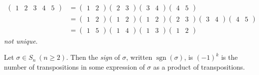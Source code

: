 \begin{example} ~\vspace*{-1.5\baselineskip}
\begin{align*}
    \begin{pmatrix}1 & 2 & 3 & 4 & 5\end{pmatrix} &= \begin{pmatrix}1 & 2\end{pmatrix} \begin{pmatrix}2 & 3\end{pmatrix} \begin{pmatrix}3 & 4\end{pmatrix} \begin{pmatrix}4 & 5\end{pmatrix} \\
    &= \begin{pmatrix}1 & 2\end{pmatrix} \begin{pmatrix}1 & 2\end{pmatrix} \begin{pmatrix}1 & 2\end{pmatrix} \begin{pmatrix}2 & 3\end{pmatrix} \begin{pmatrix}3 & 4\end{pmatrix} \begin{pmatrix}4 & 5\end{pmatrix} \\
    &= \begin{pmatrix}1 & 5\end{pmatrix} \begin{pmatrix}1 & 4\end{pmatrix} \begin{pmatrix}1 & 3\end{pmatrix} \begin{pmatrix}1 & 2\end{pmatrix}
\end{align*}
\emph{not unique}.
\end{example}

\begin{definition}
Let \(\sigma \in S_n \ (n \geq 2)\).
Then the \emph{sign} of \(\sigma\), written \(\operatorname{sgn}(\sigma)\), is \((-1)^k\) is the number of transpositions in some expression of \(\sigma\) as a product of transpositions.
\end{definition}

